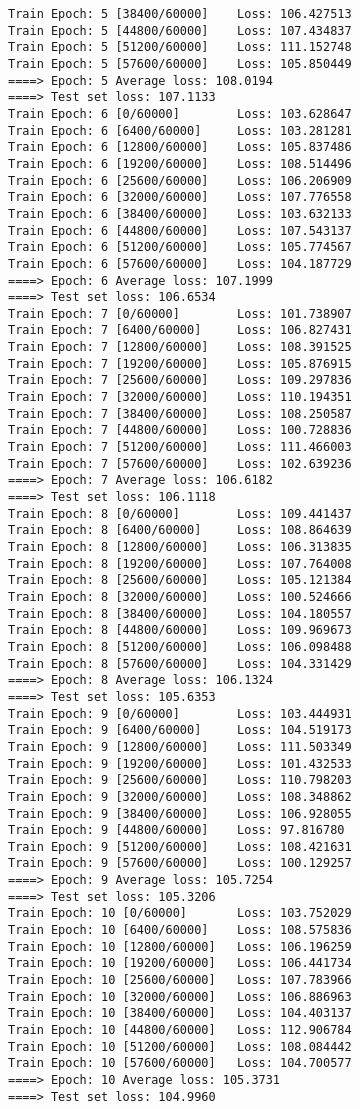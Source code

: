 \documentclass[11pt]{article}
\begin{document}
\begin{Verbatim}[commandchars=\\\{\}]
Train Epoch: 5 [38400/60000]    Loss: 106.427513
Train Epoch: 5 [44800/60000]    Loss: 107.434837
Train Epoch: 5 [51200/60000]    Loss: 111.152748
Train Epoch: 5 [57600/60000]    Loss: 105.850449
====> Epoch: 5 Average loss: 108.0194
====> Test set loss: 107.1133
Train Epoch: 6 [0/60000]        Loss: 103.628647
Train Epoch: 6 [6400/60000]     Loss: 103.281281
Train Epoch: 6 [12800/60000]    Loss: 105.837486
Train Epoch: 6 [19200/60000]    Loss: 108.514496
Train Epoch: 6 [25600/60000]    Loss: 106.206909
Train Epoch: 6 [32000/60000]    Loss: 107.776558
Train Epoch: 6 [38400/60000]    Loss: 103.632133
Train Epoch: 6 [44800/60000]    Loss: 107.543137
Train Epoch: 6 [51200/60000]    Loss: 105.774567
Train Epoch: 6 [57600/60000]    Loss: 104.187729
====> Epoch: 6 Average loss: 107.1999
====> Test set loss: 106.6534
Train Epoch: 7 [0/60000]        Loss: 101.738907
Train Epoch: 7 [6400/60000]     Loss: 106.827431
Train Epoch: 7 [12800/60000]    Loss: 108.391525
Train Epoch: 7 [19200/60000]    Loss: 105.876915
Train Epoch: 7 [25600/60000]    Loss: 109.297836
Train Epoch: 7 [32000/60000]    Loss: 110.194351
Train Epoch: 7 [38400/60000]    Loss: 108.250587
Train Epoch: 7 [44800/60000]    Loss: 100.728836
Train Epoch: 7 [51200/60000]    Loss: 111.466003
Train Epoch: 7 [57600/60000]    Loss: 102.639236
====> Epoch: 7 Average loss: 106.6182
====> Test set loss: 106.1118
Train Epoch: 8 [0/60000]        Loss: 109.441437
Train Epoch: 8 [6400/60000]     Loss: 108.864639
Train Epoch: 8 [12800/60000]    Loss: 106.313835
Train Epoch: 8 [19200/60000]    Loss: 107.764008
Train Epoch: 8 [25600/60000]    Loss: 105.121384
Train Epoch: 8 [32000/60000]    Loss: 100.524666
Train Epoch: 8 [38400/60000]    Loss: 104.180557
Train Epoch: 8 [44800/60000]    Loss: 109.969673
Train Epoch: 8 [51200/60000]    Loss: 106.098488
Train Epoch: 8 [57600/60000]    Loss: 104.331429
====> Epoch: 8 Average loss: 106.1324
====> Test set loss: 105.6353
Train Epoch: 9 [0/60000]        Loss: 103.444931
Train Epoch: 9 [6400/60000]     Loss: 104.519173
Train Epoch: 9 [12800/60000]    Loss: 111.503349
Train Epoch: 9 [19200/60000]    Loss: 101.432533
Train Epoch: 9 [25600/60000]    Loss: 110.798203
Train Epoch: 9 [32000/60000]    Loss: 108.348862
Train Epoch: 9 [38400/60000]    Loss: 106.928055
Train Epoch: 9 [44800/60000]    Loss: 97.816780
Train Epoch: 9 [51200/60000]    Loss: 108.421631
Train Epoch: 9 [57600/60000]    Loss: 100.129257
====> Epoch: 9 Average loss: 105.7254
====> Test set loss: 105.3206
Train Epoch: 10 [0/60000]       Loss: 103.752029
Train Epoch: 10 [6400/60000]    Loss: 108.575836
Train Epoch: 10 [12800/60000]   Loss: 106.196259
Train Epoch: 10 [19200/60000]   Loss: 106.441734
Train Epoch: 10 [25600/60000]   Loss: 107.783966
Train Epoch: 10 [32000/60000]   Loss: 106.886963
Train Epoch: 10 [38400/60000]   Loss: 104.403137
Train Epoch: 10 [44800/60000]   Loss: 112.906784
Train Epoch: 10 [51200/60000]   Loss: 108.084442
Train Epoch: 10 [57600/60000]   Loss: 104.700577
====> Epoch: 10 Average loss: 105.3731
====> Test set loss: 104.9960
    \end{Verbatim}
\end{document}
